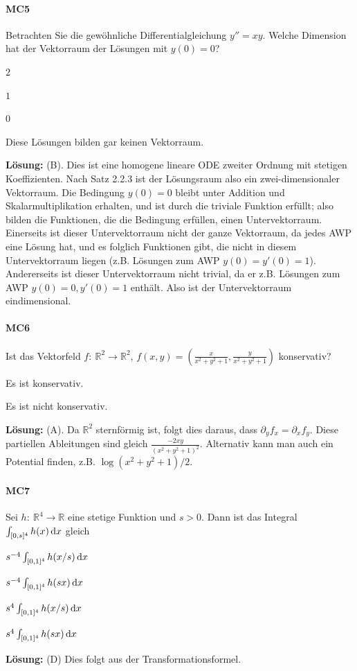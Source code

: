 \documentclass[a4paper,10pt]{article}
\def\R{\mathbb{R}}
\begin{document}
{\paragraph{MC5} Betrachten Sie die gewöhnliche Differentialgleichung \( y'' = xy \). Welche Dimension hat der Vektorraum der Lösungen mit \( y(0) = 0 \)?
\begin{enumerate*}
    \item \( 2 \)
    \item \( 1 \)
    \item \( 0 \)
    \item Diese Lösungen bilden gar keinen Vektorraum.
\end{enumerate*}
\textbf{Lösung:} (B). Dies ist eine homogene lineare ODE zweiter Ordnung mit stetigen Koeffizienten. Nach Satz 2.2.3 ist der Lösungsraum also ein zwei-dimensionaler Vektorraum. Die Bedingung \( y(0) = 0 \) bleibt unter Addition und Skalarmultiplikation erhalten, und ist durch die triviale Funktion erfüllt; also bilden die Funktionen, die die Bedingung erfüllen, einen Untervektorraum. Einerseits ist dieser Untervektorraum nicht der ganze Vektorraum, da jedes AWP eine Lösung hat, und es folglich Funktionen gibt, die nicht in diesem Untervektorraum liegen (z.B. Lösungen zum AWP \( y(0) = y'(0) = 1 \)). Andererseits ist dieser Untervektorraum nicht trivial, da er z.B. Lösungen zum AWP \( y(0) = 0, y'(0) = 1 \) enthält. Also ist der Untervektorraum eindimensional.

\paragraph{MC6} Ist das Vektorfeld \( f: \: \R^2 \to \R^2 \),
\(
    f(x, y) = \left( \frac{x}{x^2 +y^2 + 1}, \frac{y}{x^2 + y^2 + 1} \right)
\)
konservativ?
\begin{enumerate*}
    \item Es ist konservativ.
    \item Es ist nicht konservativ.
\end{enumerate*}
\textbf{Lösung:} (A). Da \( \R^2 \) sternförmig ist, folgt dies daraus, dass \( \partial_y f_x = \partial_x f_y \). Diese partiellen Ableitungen sind gleich \( \frac{-2xy}{(x^2 + y^2 + 1)^2} \). Alternativ kann man auch ein Potential finden, z.B. \( \log(x^2 + y^2 + 1) / 2 \).

\paragraph{MC7} Sei \( h: \: \R^4 \to \R \) eine stetige Funktion und \( s > 0 \). Dann ist das Integral
\(
    \int_{[0, s]^4} h(x) \odif{x}
\)
gleich
\begin{enumerate*}
    \item \( s^{-4} \int_{[0, 1]^4} h(x/s) \odif{x} \)
    \item \( s^{-4} \int_{[0, 1]^4} h(sx) \odif{x} \)
    \item \( s^4 \int_{[0, 1]^4} h(x/s) \odif{x} \)
    \item \( s^4 \int_{[0, 1]^4} h(sx) \odif{x} \)
\end{enumerate*}
\textbf{Lösung:} (D) Dies folgt aus der Transformationsformel.

}
\end{document}
